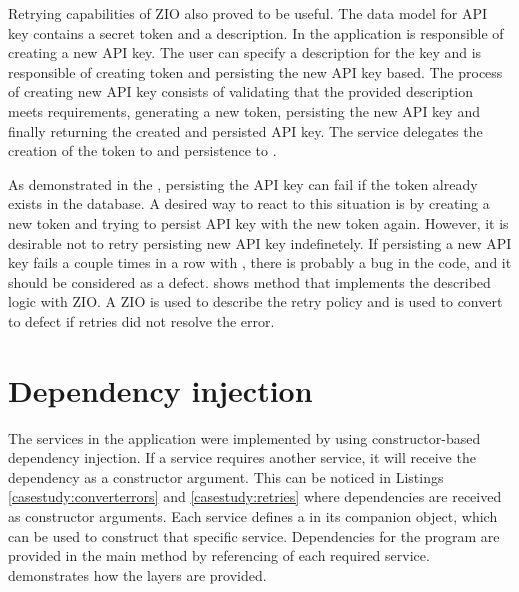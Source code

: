 

Retrying capabilities of ZIO also proved to be useful. The data model for API key contains a secret token and a description. In the application  is responsible of creating a new API key. The user can specify a description for the key and  is responsible of creating token and persisting the new API key based. The process of creating new API key consists of validating that the provided description meets requirements, generating a new token, persisting the new API key and finally returning the created and persisted API key. The service delegates the creation of the token to  and persistence to .



As demonstrated in the , persisting the API key can fail if the token already exists in the database. A desired way to react to this situation is by creating a new token and trying to persist API key with the new token again. However, it is desirable not to retry persisting new API key indefinetely. If persisting a new API key fails a couple times in a row with , there is probably a bug in the code, and it should be considered as a defect.  shows  method that implements the described logic with ZIO. A ZIO  is used to describe the retry policy and  is used to convert  to defect if retries did not resolve the error.


\section{Dependency injection}
The services in the application were implemented by using constructor-based dependency injection. If a service requires another service, it will receive the dependency as a constructor argument. This can be noticed in Listings \ref{casestudy:converterrors} and \ref{casestudy:retries} where dependencies are received as constructor arguments. Each service defines a  in its companion object, which can be used to construct that specific service. Dependencies for the program are provided in the main method by referencing  of each required service.  demonstrates how the layers are provided.

